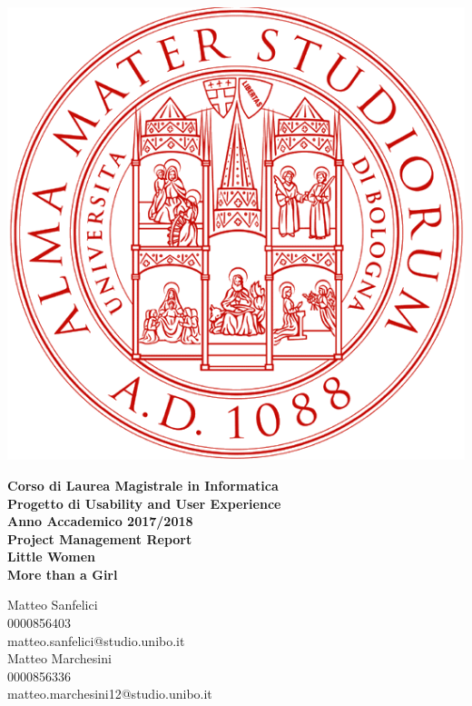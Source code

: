 \documentclass[12pt,a4paper]{report}
\begin{document}
\begin{titlepage}
\vspace{15mm}
\begin{center}
  \includegraphics{"Images Latex/Project Management Report/UniBo-Universita-di-Bologna"}
\end{center}
\begin{center}
{\normalsize{\bf Corso di Laurea Magistrale in Informatica}}\\
\vspace{5mm}
{\Large{\bf Progetto di Usability and User Experience}}\\
\vspace{5mm}
{\normalsize{\bf Anno Accademico 2017/2018}}\\
\vspace{20mm}
{\normalsize{\bf Project Management Report}}\\
\vspace{5mm}
{\Huge{\bf Little Women}}\\
\vspace{5mm}
{\Large{\bf More than a Girl}}\\
\vspace{25mm}
\end{center}
\begin{flushright}
{\large{Matteo Sanfelici\\0000856403\\matteo.sanfelici@studio.unibo.it\\}}
\vspace{5mm}
{\large{Matteo Marchesini\\0000856336\\matteo.marchesini12@studio.unibo.it}}
\end{flushright}
\end{titlepage}
\tableofcontents
\end{document}

